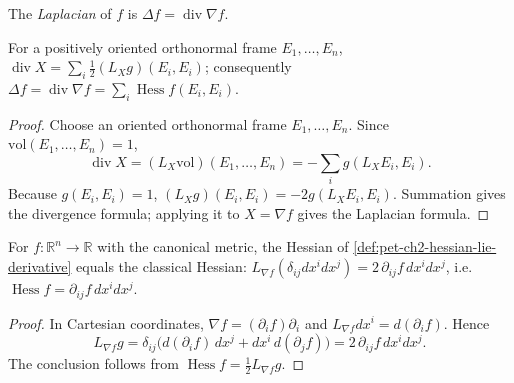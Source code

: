 \begin{definition}[Laplacian]
  \label{def:pet-ch2-laplacian}


  The \emph{Laplacian} of $f$ is $\Delta f=\operatorname{div}\nabla f$.
\end{definition}

\begin{proposition}
  \label{prop:pet-ch2-divergence-trace-formula}


  For a positively oriented orthonormal frame $E_1,\dots,E_n$,
  $\operatorname{div}X=\sum_i\frac12(L_Xg)(E_i,E_i)$; consequently
  $\Delta f=\operatorname{div}\nabla f=\sum_i\operatorname{Hess}f(E_i,E_i)$.
\end{proposition}
\begin{proof}

  \sketch
  Choose an oriented orthonormal
  frame $E_1,\dots,E_n$. Since
  $\mathrm{vol}(E_1,\dots,E_n)=1$,
  \[
    \operatorname{div}X
      =(L_X\mathrm{vol})(E_1,\dots,E_n)
      =-\sum_i g(L_XE_i,E_i).
  \]
  Because $g(E_i,E_i)=1$,
  $(L_Xg)(E_i,E_i)=-2g(L_XE_i,E_i)$. Summation gives the divergence
  formula; applying it to $X=\nabla f$ gives the Laplacian formula.
\end{proof}

\begin{proposition}
  \label{prop:pet-ch2-hessian-euclidean-agreement}


  For $f:\mathbb{R}^n\to\mathbb{R}$ with the canonical metric, the Hessian of
  \cref{def:pet-ch2-hessian-lie-derivative} equals the classical Hessian:
  $L_{\nabla f}(\delta_{ij}dx^idx^j)=2\,\partial_{ij}f\,dx^idx^j$, i.e.
  $\operatorname{Hess}f=\partial_{ij}f\,dx^idx^j$.
\end{proposition}
\begin{proof}

  \sketch
  In Cartesian coordinates,
  $\nabla f=(\partial_i f)\partial_i$ and
  $L_{\nabla f}dx^i=d(\partial_i f)$. Hence
  \[
    L_{\nabla f}g
      =\delta_{ij}\big(d(\partial_i f)\,dx^j
                       +dx^i\,d(\partial_j f)\big)
      =2\,\partial_{ij}f\,dx^i dx^j.
  \]
  The conclusion follows from
  $\operatorname{Hess}f=\tfrac12L_{\nabla f}g$.
\end{proof}

